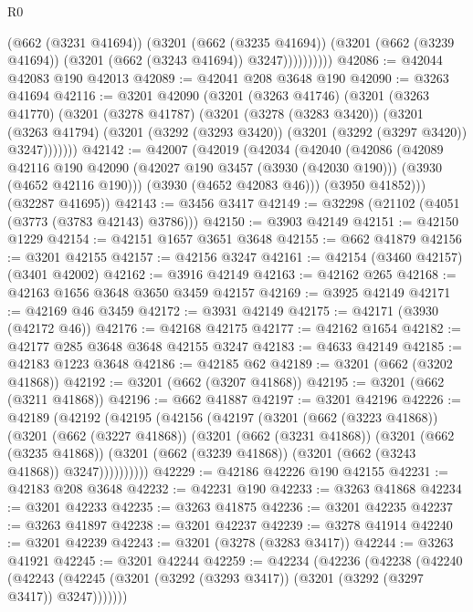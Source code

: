 \begin{lexlean}{R0}
\begin{coremodule}
                  (@662 (@3231 @41694))
                  (@3201
                    (@662 (@3235 @41694))
                    (@3201 (@662 (@3239 @41694)) (@3201 (@662 (@3243 @41694)) @3247))))))))))
@42086 := @42044 @42083 @190 @42013
@42089 := @42041 @208 @3648 @190
@42090 := @3263 @41694
@42116 := @3201
    @42090
    (@3201
      (@3263 @41746)
      (@3201
        (@3263 @41770)
        (@3201
          (@3278 @41787)
          (@3201
            (@3278 (@3283 @3420))
            (@3201
              (@3263 @41794)
              (@3201 (@3292 (@3293 @3420)) (@3201 (@3292 (@3297 @3420)) @3247)))))))
@42142 := @42007
    (@42019
      (@42034
        (@42040
          (@42086
            (@42089
              @42116
              @190
              @42090
              (@42027 @190 @3457 (@3930 (@42030 @190)))
              (@3930 (@4652 @42116 @190)))
            (@3930 (@4652 @42083 @46)))
          (@3950 @41852)))
      (@32287 @41695))
@42143 := @3456 @3417
@42149 := @32298 (@21102 (@4051 (@3773 (@3783 @42143) @3786)))
@42150 := @3903 @42149
@42151 := @42150 @1229
@42154 := @42151 @1657 @3651 @3648
@42155 := @662 @41879
@42156 := @3201 @42155
@42157 := @42156 @3247
@42161 := @42154 (@3460 @42157) (@3401 @42002)
@42162 := @3916 @42149
@42163 := @42162 @265
@42168 := @42163 @1656 @3648 @3650 @3459 @42157
@42169 := @3925 @42149
@42171 := @42169 @46 @3459
@42172 := @3931 @42149
@42175 := @42171 (@3930 (@42172 @46))
@42176 := @42168 @42175
@42177 := @42162 @1654
@42182 := @42177 @285 @3648 @3648 @42155 @3247
@42183 := @4633 @42149
@42185 := @42183 @1223 @3648
@42186 := @42185 @62
@42189 := @3201 (@662 (@3202 @41868))
@42192 := @3201 (@662 (@3207 @41868))
@42195 := @3201 (@662 (@3211 @41868))
@42196 := @662 @41887
@42197 := @3201 @42196
@42226 := @42189
    (@42192
      (@42195
        (@42156
          (@42197
            (@3201
              (@662 (@3223 @41868))
              (@3201
                (@662 (@3227 @41868))
                (@3201
                  (@662 (@3231 @41868))
                  (@3201
                    (@662 (@3235 @41868))
                    (@3201 (@662 (@3239 @41868)) (@3201 (@662 (@3243 @41868)) @3247))))))))))
@42229 := @42186 @42226 @190 @42155
@42231 := @42183 @208 @3648
@42232 := @42231 @190
@42233 := @3263 @41868
@42234 := @3201 @42233
@42235 := @3263 @41875
@42236 := @3201 @42235
@42237 := @3263 @41897
@42238 := @3201 @42237
@42239 := @3278 @41914
@42240 := @3201 @42239
@42243 := @3201 (@3278 (@3283 @3417))
@42244 := @3263 @41921
@42245 := @3201 @42244
@42259 := @42234
    (@42236
      (@42238
        (@42240
          (@42243 (@42245 (@3201 (@3292 (@3293 @3417)) (@3201 (@3292 (@3297 @3417)) @3247)))))))

\end{coremodule}
\end{lexlean}
